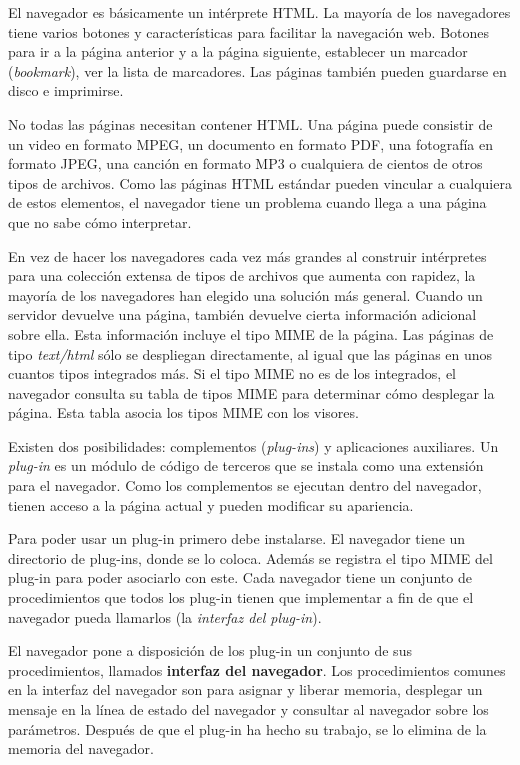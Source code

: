 \documentclass[10pt,a4paper]{report}
\begin{document}
				\par El navegador es básicamente un intérprete HTML. La mayoría de los navegadores tiene varios botones y características para facilitar la navegación web. Botones para ir a la página anterior y a la página siguiente, establecer un marcador (\textit{bookmark}), ver la lista de marcadores. Las páginas también pueden guardarse en disco e imprimirse.
				
				\par No todas las páginas necesitan contener HTML. Una página puede consistir de un video en formato MPEG, un documento en formato PDF, una fotografía en formato JPEG, una canción en formato MP3 o cualquiera de cientos de otros tipos de archivos. Como las páginas HTML estándar pueden vincular a cualquiera de estos elementos, el navegador tiene un problema cuando llega a una página que no sabe cómo interpretar.

				\par En vez de hacer los navegadores cada vez más grandes al construir intérpretes para una colección extensa de tipos de archivos que aumenta con rapidez, la mayoría de los navegadores han elegido una solución más general. Cuando un servidor devuelve una página, también devuelve cierta información adicional sobre ella. Esta información incluye el tipo MIME de la página. Las páginas de tipo \textit{text/html} sólo se despliegan directamente, al igual que las páginas en unos cuantos tipos integrados más. Si el tipo MIME no es de los integrados, el navegador consulta su tabla de tipos MIME para determinar cómo desplegar la página. Esta tabla asocia los tipos MIME con los visores.

				\par Existen dos posibilidades: complementos (\textit{plug-ins}) y aplicaciones auxiliares. Un \textit{plug-in} es un módulo de código de terceros que se instala como una extensión para el navegador. Como los complementos se ejecutan dentro del navegador, tienen acceso a la página actual y pueden modificar su apariencia.
				
				\par Para poder usar un plug-in primero debe instalarse. El navegador tiene un directorio de plug-ins, donde se lo coloca. Además se registra el tipo MIME del plug-in para poder asociarlo con este. Cada navegador tiene un conjunto de procedimientos que todos los plug-in tienen que implementar a fin de que el navegador pueda llamarlos (la \textit{ interfaz del plug-in}).

				\par El navegador pone a disposición de los plug-in un conjunto de sus procedimientos, llamados \textbf{interfaz del navegador}. Los procedimientos comunes en la interfaz del navegador son para asignar y liberar memoria, desplegar un mensaje en la línea de estado del navegador y consultar al navegador sobre los parámetros. Después de que el plug-in ha hecho su trabajo, se lo elimina de la memoria del navegador.
				
\end{document}
